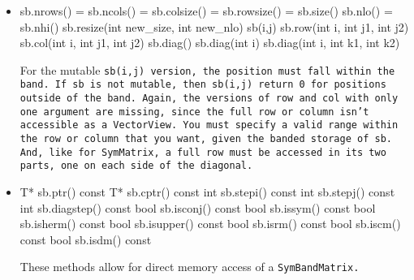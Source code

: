 \begin{itemize}

\item
\begin{tmvcode}
sb.nrows() = sb.ncols() = sb.colsize() = sb.rowsize() = sb.size()
sb.nlo() = sb.nhi()
sb.resize(int new_size, int new_nlo)
sb(i,j)
sb.row(int i, int j1, int j2)
sb.col(int i, int j1, int j2)
sb.diag()
sb.diag(int i)
sb.diag(int i, int k1, int k2)
\end{tmvcode}
For the mutable \tt{sb(i,j)} version, the position must fall within the
band.  If \tt{sb} is not mutable, then \tt{sb(i,j)} return 0 for
positions outside of the band.
Again, the versions of \tt{row} and \tt{col} with only one argument are
missing, since the full row or column isn't accessible as a \tt{VectorView}.
You must specify a valid range within the row or column that you want, 
given the banded storage of \tt{sb}.  And, like for \tt{SymMatrix}, a full row
must be accessed in its two parts, one on each side of the diagonal.

\item
\begin{tmvcode}
T* sb.ptr()
const T* sb.cptr() const
int sb.stepi() const
int sb.stepj() const
int sb.diagstep() const
bool sb.isconj() const
bool sb.issym() const
bool sb.isherm() const
bool sb.isupper() const
bool sb.isrm() const
bool sb.iscm() const
bool sb.isdm() const
\end{tmvcode}
These methods allow for direct memory access of a \tt{SymBandMatrix}.


\end{itemize}
